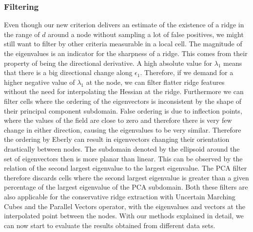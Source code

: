 \subsubsection{Filtering}

Even though our new criterion delivers an estimate of the existence of a
ridge in the range of $d$ around a node without sampling a lot of false
positives, we might still want to filter by other criteria measurable in
a local cell. The magnitude of the eigenvalues is an indicator for the
sharpness of a ridge. This comes from their property of being the
directional derivative. A high absolute value for $\lambda_1$ means that
there is a big directional change along $\epsilon_1$. Therefore, if we
demand for a higher negative value of $\lambda_1$ at the node, we can
filter flatter ridge features without the need for interpolating the
Hessian at the ridge. Furthermore we can filter cells where the ordering
of the eigenvectors is inconsistent by the shape of their principal
component subdomain. False ordering is due to inflection points, where
the values of the field are close to zero and therefore there is very
few change in either direction, causing the eigenvalues to be very
similar. Therefore the ordering by Eberly can result in eigenvectors
changing their orientation drastically between nodes. The subdomain
denoted by the ellipsoid around the set of eigenvectors then is more
planar than linear. This can be observed by the relation of the second
largest eigenvalue to the largest eigenvalue. The PCA filter therefore
discards cells where the second largest eigenvalue is greater than a
given percentage of the largest eigenvalue of the PCA subdomain. Both
these filters are also applicable for the conservative ridge extraction
with Uncertain Marching Cubes and the Parallel Vectors operator, with
the eigenvalues and vectors at the interpolated point between the nodes.
With our methods explained in detail, we can now start to evaluate the
results obtained from different data sets.